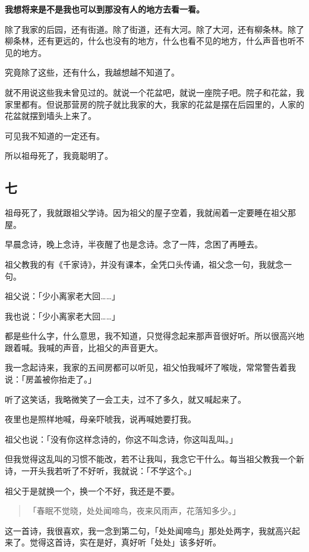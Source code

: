 \documentclass[UTF8]{ctexart}
\begin{document}
\textbf{我想将来是不是我也可以到那没有人的地方去看一看。}

除了我家的后园，还有街道。除了街道，还有大河。除了大河，还有柳条林。除了柳条林，还有更远的，什么也没有的地方，什么也看不见的地方，什么声音也听不见的地方。

究竟除了这些，还有什么，我越想越不知道了。

就不用说这些我未曾见过的。就说一个花盆吧，就说一座院子吧。院子和花盆，我家里都有。但说那营房的院子就比我家的大，我家的花盆是摆在后园里的，人家的花盆就摆到墙头上来了。

可见我不知道的一定还有。

所以祖母死了，我竟聪明了。

\subsection{七}

祖母死了，我就跟祖父学诗。因为祖父的屋子空着，我就闹着一定要睡在祖父那屋。

早晨念诗，晚上念诗，半夜醒了也是念诗。念了一阵，念困了再睡去。

祖父教我的有《千家诗》，并没有课本，全凭口头传诵，祖父念一句，我就念一句。

祖父说：「少小离家老大回……」

我也说：「少小离家老大回……」

都是些什么字，什么意思，我不知道，只觉得念起来那声音很好听。所以很高兴地跟着喊。我喊的声音，比祖父的声音更大。

我一念起诗来，我家的五间房都可以听见，祖父怕我喊坏了喉咙，常常警告着我说：「房盖被你抬走了。」

听了这笑话，我略微笑了一会工夫，过不了多久，就又喊起来了。

夜里也是照样地喊，母亲吓唬我，说再喊她要打我。

祖父也说：「没有你这样念诗的，你这不叫念诗，你这叫乱叫。」

但我觉得这乱叫的习惯不能改，若不让我叫，我念它干什么。每当祖父教我一个新诗，一开头我若听了不好听，我就说：「不学这个。」

祖父于是就换一个，换一个不好，我还是不要。

\begin{verse}
    「春眠不觉晓，处处闻啼鸟，夜来风雨声，花落知多少。」
\end{verse}


这一首诗，我很喜欢，我一念到第二句，「处处闻啼鸟」那处处两字，我就高兴起来了。觉得这首诗，实在是好，真好听「处处」该多好听。
\end{document}
